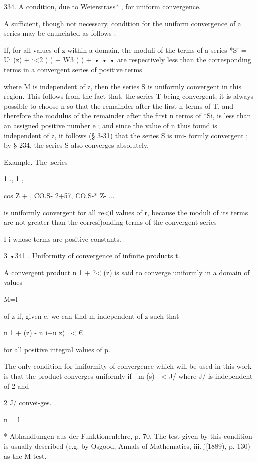 334. A condition, due to Weierstrass* , for uniform convergence. 

A sufficient, though not necessary, condition for the uniform convergence 
of a series may be enunciated as follows : — 

If, for all values of z within a domain, the moduli of the terms of a series 
*S' = Ui (z) + i<2 ( ) + W3 ( ) + • • • 
are respectively less than the corresponding terms in a convergent series 
of positive terms 

where M  is independent of z, then the series S is uniformly convergent in 
this region. This follows from the fact that, the series T being convergent, 
it is always possible to choose n so that the remainder after the first n terms 
of T, and therefore the modulus of the remainder after the first n terms 
of *Si, is less than an assigned positive number e ; and since the value of n 
thus found is independent of z, it follows (§ 3-31) that the series S is uni- 
formly convergent ; by § 234, the series S also converges absolutely. 

Example. The .scries 

1 ., 1 , 

cos Z +  , CO.S- 2+57, CO.S-* Z-  ... 

is uniformly convergent for all re<il values of r, because the moduli of its terms are not 
greater than the corresi)onding terms of the convergent series 

I i 
whose terms are positive constants. 

3 •341 . Uniformity of convergence of infinite products t. 

A convergent product n  1 + ?<  (z)  is said to converge uniformly in a domain of values 

M=l 

of z if, given e, we can tind m independent of z such that 

n  1 +   (z)  - n  i+u  z)  \ < € 

for all positive integral values of p. 

The only condition for imiformity of convergence which will be used in this work 
is that the product converges uniformly if | m (s) | < J/  where J/  is independent of 2 and 

2 J/  convei-ges. 

n = l 

* Abhandlungen aus der Funktionenlehre, p. 70. The test given by this condition is usually 
described (e.g. by Osgood, Annals of Mathematics, iii. j[1889), p. 130) as the M-test. 

